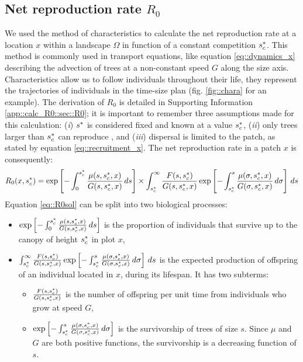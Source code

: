 \subsection{Net reproduction rate $ R_0 $}
We used the method of characteristics to calculate the net reproduction rate at a location $ x $ within a landscape $ \Omega $ in function of a constant competition $ {s}^{*}_c $. This method is commonly used in transport equations, like equation \eqref{eq::dynamics_x} describing the advection of trees at a non-constant speed $ G $ along the size axis. Characteristics allow us to follow individuals throughout their life, \ie they represent the trajectories of individuals in the time-size plan (fig. \ref{fig::chara} for an example). The derivation of $ R_0 $ is detailed in Supporting Information \ref{app::calc_R0::sec::R0}; it is important to remember three assumptions made for this calculation: (\textit{i}) $ {s}^{*} $ is considered fixed and known at a value $ {s}^{*}_c $, (\textit{ii}) only trees larger than $ {s}^{*}_c $ can reproduce \citep{Strigul2008}, and (\textit{iii}) dispersal is limited to the patch, as stated by equation \eqref{eq::recruitment_x}. The net reproduction rate in a patch $ x $ is consequently:
\begin{equation} \label{eq::R0sol}
	R_0 (x, {s}^{*}_c) = \exp \left[-\int_0^{{s}^{*}_c}\frac{\mu(s, {s}^{*}_c, x)}{G(s, {s}^{*}_c, x)} \, ds \right] \times \int_{{s}^{*}_c}^{\infty} \frac{F(s, {s}^{*}_c)}{G(s, {s}^{*}_c, x)} \exp \left[-\int_{{s}^{*}_c}^{s} \frac{\mu(\sigma, {s}^{*}_c, x)}{G(\sigma, {s}^{*}_c, x)} \, d\sigma \right] \, ds
\end{equation}
Equation \eqref{eq::R0sol} can be split into two biological processes:
\begin{itemize}
	\item $ \exp\left[-\int_0^{{s}^{*}_c}\frac{\mu(s, {s}^{*}_c, x)}{G(s, {s}^{*}_c, x)} \, ds \right] $ is the proportion of individuals that survive up to the canopy of height $ {s}^{*}_c $ in plot $ x $,
	\item $ \int_{{s}^{*}_c}^{\infty} \frac{F(s, {s}^{*}_c)}{G(s, {s}^{*}_c, x)} \exp \left[-\int_{{s}^{*}_c}^{s} \frac{\mu(\sigma, {s}^{*}_c, x)}{G(\sigma, {s}^{*}_c, x)} \, d\sigma \right] \, ds $ is the expected production of offspring of an individual located in $ x $, during its lifespan. It has two subterms:
	\begin{itemize}[label=$ \circ $]
		\item $ \frac{F(s, {s}^{*}_c)}{G(s, {s}^{*}_c, x)} $ is the number of offspring per unit time from individuals who grow at speed $ G $,
		\item $ \exp \left[-\int_{{s}^{*}_c}^{s} \frac{\mu(\sigma, {s}^{*}_c, x)}{G(\sigma, {s}^{*}_c, x)} \, d\sigma \right] $ is the survivorship of trees of size $ s $. Since $ \mu $ and $ G $ are both positive functions, the survivorship is a decreasing function of $ s $.
	\end{itemize}
\end{itemize}

